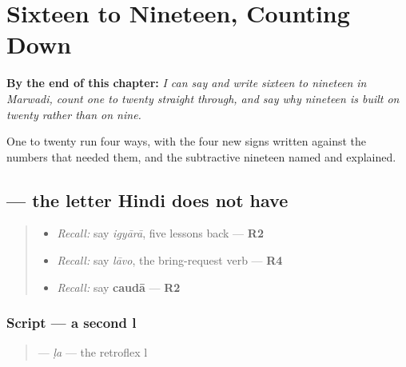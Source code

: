 
\chapter{Sixteen to Nineteen, Counting Down}
\label{ch:mw-teens-to-nineteen}

\begin{chapteropening}
\textbf{By the end of this chapter:} \emph{I can say and write sixteen to nineteen in Marwadi, count one to twenty straight through, and say why nineteen is built on twenty rather than on nine.}

One to twenty run four ways, with the four new signs written against the numbers that needed them, and the subtractive nineteen named and explained.
\end{chapteropening}

\section[\texorpdfstring{\mw{ळ} (ḷa)}{ळ (ḷa)}]{ — the letter Hindi does not have}

\label{lesson:MW-W38-lla}



\begin{quote}
\begin{itemize}
\raggedright
  \item \emph{Recall:} say \emph{igyārā}, five lessons back — \textbf{R2}
  \item \emph{Recall:} say \emph{lāvo}, the bring-request verb — \textbf{R4}
  \item \emph{Recall:} say \textbf{caudā} — \textbf{R2}
\end{itemize}
\end{quote}

\subsection*{Script — a second l}

\begin{quote}
\textbf{} — \emph{ḷa} — the retroflex l
\end{quote}

